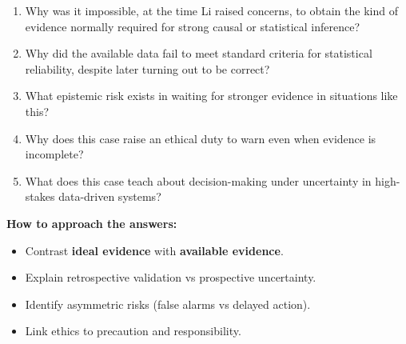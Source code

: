 \documentclass[
  12pt,
]{book}
\providecommand{\tightlist}{%
  \setlength{\itemsep}{0pt}\setlength{\parskip}{0pt}}
\begin{document}
\begin{enumerate}
\def\labelenumi{\arabic{enumi}.}
\tightlist
\item
  Why was it impossible, at the time Li raised concerns, to obtain the kind of evidence normally required for strong causal or statistical inference?\\
\item
  Why did the available data fail to meet standard criteria for statistical reliability, despite later turning out to be correct?\\
\item
  What epistemic risk exists in waiting for stronger evidence in situations like this?\\
\item
  Why does this case raise an ethical duty to warn even when evidence is incomplete?\\
\item
  What does this case teach about decision-making under uncertainty in high-stakes data-driven systems?
\end{enumerate}

\textbf{How to approach the answers:}

\begin{itemize}
\tightlist
\item
  Contrast \textbf{ideal evidence} with \textbf{available evidence}.
\item
  Explain retrospective validation vs prospective uncertainty.
\item
  Identify asymmetric risks (false alarms vs delayed action).
\item
  Link ethics to precaution and responsibility.
\end{itemize}


\end{document}
